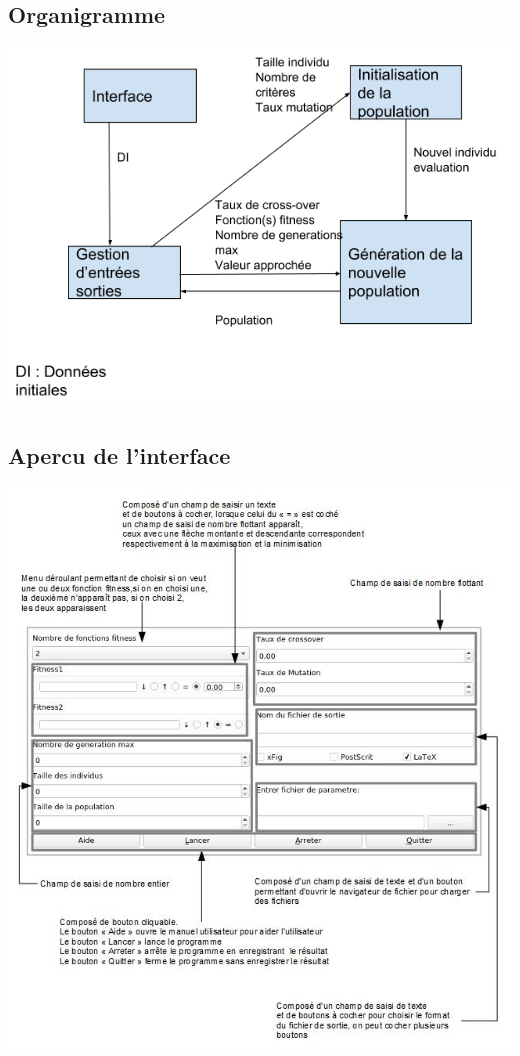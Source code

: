 \documentclass[a4paper,11pt]{article}
\begin{document}
		\subsection{Organigramme}
		\centerline{\includegraphics{OrganigrammeV8.png}}
		
		\subsection{Apercu de l'interface}
		\centerline{\includegraphics{InterfaceExpliquer.png}}
	
\end{document}
